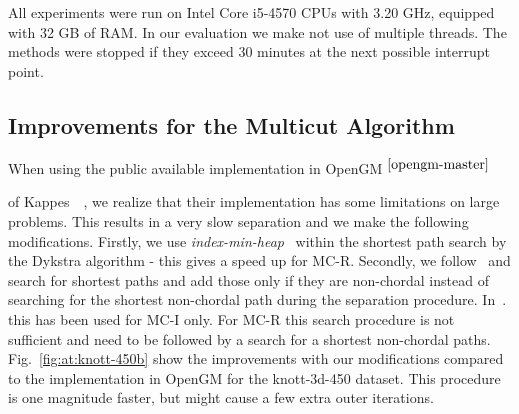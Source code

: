 \documentclass[10pt,twocolumn,letterpaper]{article}
\newcommand{\footref}[1]{%
    $^{\ref{#1}}$%
}
\theoremstyle{definition}
\begin{document}
All experiments were run on Intel Core i5-4570 CPUs
with 3.20 GHz, equipped with 32 GB of RAM.
In our evaluation we make not use of multiple threads.
The methods were stopped if they exceed 30 minutes at the next possible interrupt point.





\subsection{Improvements for the Multicut Algorithm}\label{sec:tunedMC} 
When using the  public available implementation in OpenGM\footref{opengm-master}
of Kappes~\etal~\cite{kappes_2013_arxiv}, we realize that their implementation has some limitations on large problems.
This results in a very slow separation and we make the following modifications.
Firstly, we use \emph{index-min-heap}~\cite{Sedgewick-2011} within the shortest path search by the Dykstra algorithm - this gives a speed up for MC-R.
Secondly, we follow~\cite{kroeger_2012_eccv} and search for shortest paths and add those only if they are non-chordal instead of searching for the shortest non-chordal path
during the separation procedure. 
In~\cite{kroeger_2012_eccv}. this has been used for MC-I only. 
For MC-R this search procedure is not sufficient and need to be followed by a search for a shortest non-chordal paths.
%
Fig.~\ref{fig:at:knott-450b} show the improvements with our modifications compared to the implementation in OpenGM for the knott-3d-450 dataset.
This procedure is one magnitude faster, but might cause a few extra outer iterations.
\end{document}
